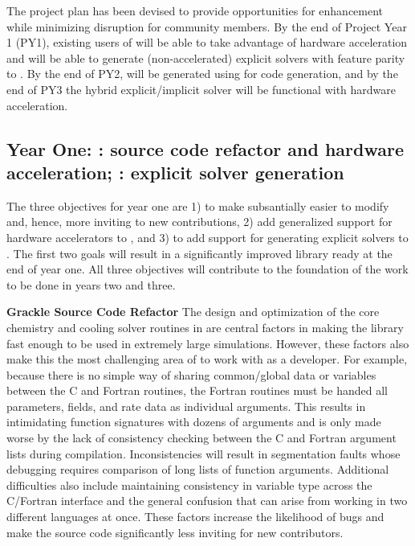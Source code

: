 The project plan has been devised to provide opportunities for enhancement
while minimizing disruption for community members.  By the end of Project Year
1 (PY1), existing users of \grackle{} will be able to take advantage of hardware
acceleration and \dengo{} will be able to generate (non-accelerated) explicit
solvers with feature parity to \grackle{}.  By the end of PY2, \grackle{} will
be generated using \dengo{} for code generation, and by the end of PY3 the
hybrid explicit/implicit solver will be functional with hardware acceleration.

\subsection{Year One: \grackle{}: source code refactor and hardware
  acceleration; \dengo{}: explicit solver generation}

The three objectives for year one are 1) to make \grackle{} subsantially
easier to modify and, hence, more inviting to new contributions, 2)
add generalized support for hardware accelerators to \grackle{}, and
3) to add support for generating explicit solvers to \dengo{}.  The
first two goals will result in a significantly improved \grackle{}
library ready at the end of year one. All three objectives will
contribute to the foundation of the work to be done in years two and
three.

\noindent \textbf{Grackle Source Code Refactor}
The design and optimization of the core chemistry and cooling solver
routines in \grackle{} are central factors in making the library fast
enough to be used in extremely large simulations.  However, these
factors also make this the most challenging area of \grackle{} to
work with as a developer.  For example, because there is no simple way
of sharing common/global data or variables between the C and Fortran
routines, the Fortran routines must be handed all parameters, fields,
and rate data as individual arguments.  This results in intimidating
function signatures with dozens of arguments and is only made worse by
the lack of consistency checking between the C and Fortran argument
lists during compilation.  Inconsistencies will result in segmentation
faults whose debugging requires comparison of long lists of function
arguments.  Additional difficulties also include maintaining
consistency in variable type across the C/Fortran interface and the
general confusion that can arise from working in two different
languages at once.  These factors increase the likelihood of bugs and
make the source code significantly less inviting for new
contributors.

